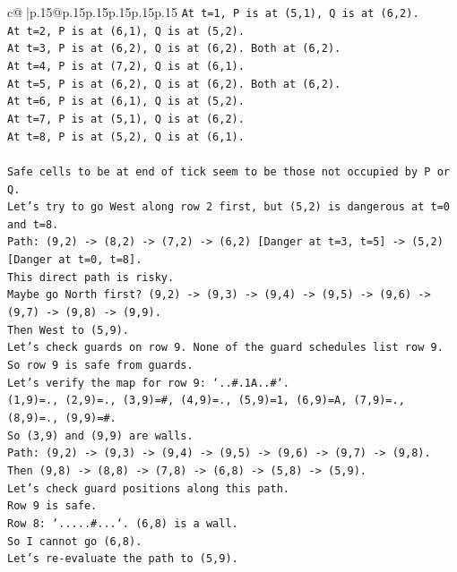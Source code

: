 \documentclass{article}
\begin{document}
{\begin{supertabular}{c@{$\;$}|p{.15\linewidth}@{}p{.15\linewidth}p{.15\linewidth}p{.15\linewidth}p{.15\linewidth}p{.15\linewidth}}
{{{\texttt{At t=1, P is at (5,1), Q is at (6,2).} \\
\texttt{At t=2, P is at (6,1), Q is at (5,2).} \\
\texttt{At t=3, P is at (6,2), Q is at (6,2). Both at (6,2).} \\
\texttt{At t=4, P is at (7,2), Q is at (6,1).} \\
\texttt{At t=5, P is at (6,2), Q is at (6,2). Both at (6,2).} \\
\texttt{At t=6, P is at (6,1), Q is at (5,2).} \\
\texttt{At t=7, P is at (5,1), Q is at (6,2).} \\
\texttt{At t=8, P is at (5,2), Q is at (6,1).} \\
\\ 
\texttt{Safe cells to be at end of tick seem to be those not occupied by P or Q.} \\
\texttt{Let's try to go West along row 2 first, but (5,2) is dangerous at t=0 and t=8.} \\
\texttt{Path: (9,2) {-}> (8,2) {-}> (7,2) {-}> (6,2) {[}Danger at t=3, t=5{]} {-}> (5,2) {[}Danger at t=0, t=8{]}.} \\
\texttt{This direct path is risky.} \\
\texttt{Maybe go North first? (9,2) {-}> (9,3) {-}> (9,4) {-}> (9,5) {-}> (9,6) {-}> (9,7) {-}> (9,8) {-}> (9,9).} \\
\texttt{Then West to (5,9).} \\
\texttt{Let's check guards on row 9. None of the guard schedules list row 9. So row 9 is safe from guards.} \\
\texttt{Let's verify the map for row 9: `..\#.1A..\#`.} \\
\texttt{(1,9)=., (2,9)=., (3,9)=\#, (4,9)=., (5,9)=1, (6,9)=A, (7,9)=., (8,9)=., (9,9)=\#.} \\
\texttt{So (3,9) and (9,9) are walls.} \\
\texttt{Path: (9,2) {-}> (9,3) {-}> (9,4) {-}> (9,5) {-}> (9,6) {-}> (9,7) {-}> (9,8).} \\
\texttt{Then (9,8) {-}> (8,8) {-}> (7,8) {-}> (6,8) {-}> (5,8) {-}> (5,9).} \\
\texttt{Let's check guard positions along this path.} \\
\texttt{Row 9 is safe.} \\
\texttt{Row 8: `.....\#...`. (6,8) is a wall.} \\
\texttt{So I cannot go (6,8).} \\
\texttt{Let's re{-}evaluate the path to (5,9).} \\
}}}
\end{supertabular}}
\end{document}
